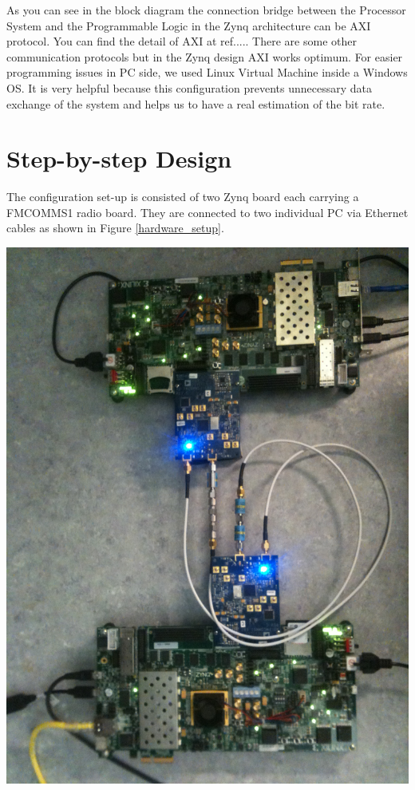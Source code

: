 As you can see in the block diagram the connection bridge between the Processor System and the Programmable Logic in the Zynq architecture can be AXI protocol. You can find the detail of AXI at ref..... There are some other communication protocols but in the Zynq design AXI works optimum.
For easier programming issues in PC side, we used Linux Virtual Machine inside a Windows OS. It is very helpful because this configuration prevents unnecessary data exchange of the system and helps us to have a real estimation of the bit rate.\\

\section{Step-by-step Design}
The configuration set-up is consisted of two Zynq board each carrying a FMCOMMS1 radio board. They are connected to two individual PC via Ethernet cables as shown in Figure \ref{hardware_setup}.\\

\begin{center}
\includegraphics[width=\textwidth]{content/fig/hardware_setup.JPG}
\label{hardware_setup}
\end{center}

